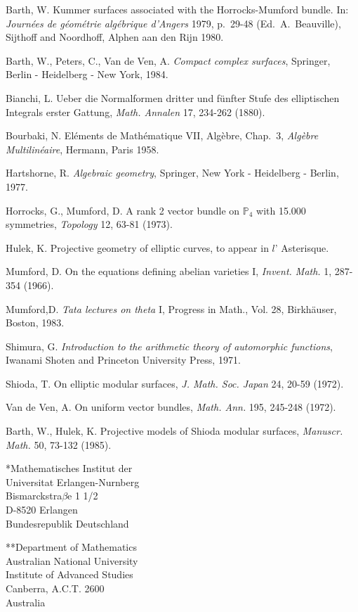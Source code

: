 \begin{thebibliography}{99}\pageoriginale
{} Barth, W. Kummer surfaces associated with the
Horrocks-Mumford bundle. In: {\em Journ\'ees de g\'eom\'etrie
alg\'ebrique d'Angers} 1979, p.~29-48 (Ed.~A.~Beauville), Sijthoff and
Noordhoff, Alphen aan den Rijn 1980.

 Barth, W., Peters, C., Van de Ven, A. {\em
Compact complex surfaces}, Springer, Berlin - Heidelberg - New York,
1984. 

 Bianchi, L. Ueber die Normalformen dritter und
f\"unfter Stufe des elliptischen Integrals erster Gattung, {\em
Math. Annalen} 17, 234-262 (1880).

 Bourbaki, N. El\'ements de Math\'ematique VII,
Alg\`ebre, Chap.~3, {\em Alg\`ebre Multilin\'eaire}, Hermann, Paris
1958. 

 Hartshorne, R. {\em Algebraic geometry},
Springer, New York - Heidelberg - Berlin, 1977.

 Horrocks, G., Mumford, D. A rank 2 vector bundle
on $\mathbb{P}_{4}$ with 15.000 symmetries, {\em Topology} 12, 63-81
(1973). 

 Hulek, K. Projective geometry of elliptic curves,
to appear in $l$' Asterisque.

 Mumford, D. On the equations defining abelian
varieties I, {\em Invent. Math.} 1, 287-354 (1966).

 Mumford,\pageoriginale D. {\em Tata lectures on
theta} I, Progress in Math., Vol. 28, Birkh\"auser, Boston, 1983.

 Shimura, G. {\em Introduction to the arithmetic
theory of automorphic functions}, Iwanami Shoten and Princeton
University Press, 1971.

 Shioda, T. On elliptic modular surfaces, {\em
J. Math. Soc. Japan} 24, 20-59 (1972).

 Van de Ven, A. On uniform vector bundles, {\em
Math. Ann.} 195, 245-248 (1972).

 Barth, W., Hulek, K. Projective models of Shioda
modular surfaces, {\em Manuscr. Math.} 50, 73-132 (1985).
\end{thebibliography}

\noindent
*Mathematisches Institut der\\
Universitat Erlangen-Nurnberg\\
Bismarckstra$\beta$e 1 1/2\\
D-8520 Erlangen\\
Bundesrepublik Deutschland\\

\medskip

\noindent
**Department of Mathematics\\
Australian National University\\
Institute of Advanced Studies\\
Canberra, A.C.T. 2600\\
Australia




